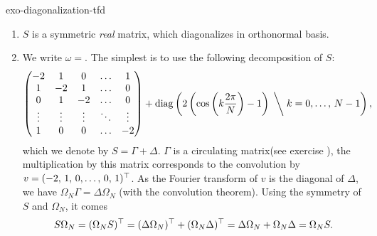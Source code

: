 
\begin{correction}{exo-diagonalization-tfd}
\begin{enumerate}
\item {} $ S $ is a symmetric \textit{real} matrix, which diagonalizes in orthonormal basis.
\item We write $ \omega = $. The simplest is to use the following decomposition of $ S $:
\begin{equation*}
\begin{pmatrix} -2 & 1 & 0 & \ldots & 1 \\1 & -2 & 1 & \ldots & 0 \\0 & 1 & -2 & \ldots & 0 \\\vdots & \vdots & \vdots & \ddots & \vdots \\1 & 0 & 0 & \ldots & -2 \end{pmatrix} + \operatorname{diag} \left(2 \left(\cos \left(k \frac{2 \pi}{N} \right) -1 \right) \; \bigg \backslash \; k = 0, \ldots, \, N-1 \right),
\end{equation*}
 which we denote by $ S = \Gamma + \Delta $. $ \Gamma $ is a circulating matrix(see exercise ), the multiplication by this matrix corresponds to the convolution by $ v = (- 2, \, 1, \, 0, \ldots, \, 0, \, 1)^\top $. As the Fourier transform of $ v $ is the diagonal of $ \Delta $, we have $ \Omega_N \Gamma = \Delta \Omega_N $ (with the convolution theorem). Using the symmetry of $ S $ and $ \Omega_N $, it comes
\begin{equation*}
S \Omega_N = (\Omega_N S)^\top = (\Delta \Omega_N)^\top + (\Omega_N \Delta)^\top = \Delta \Omega_N + \Omega_N \Delta = \Omega_N S.
\end{equation*}
 

\end{enumerate}
\end{correction}
